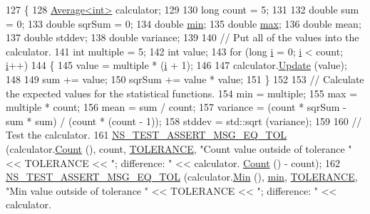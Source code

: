 \begin{DoxyCode}
127 \{
128   \hyperlink{classns3_1_1Average}{Average<int>} calculator;
129 
130   \textcolor{keywordtype}{long} count = 5;
131 
132   \textcolor{keywordtype}{double} sum = 0;
133   \textcolor{keywordtype}{double} sqrSum = 0;
134   \textcolor{keywordtype}{double} \hyperlink{80211b_8c_ac6afabdc09a49a433ee19d8a9486056d}{min};
135   \textcolor{keywordtype}{double} \hyperlink{80211b_8c_affe776513b24d84b39af8ab0930fef7f}{max};
136   \textcolor{keywordtype}{double} mean;
137   \textcolor{keywordtype}{double} stddev;
138   \textcolor{keywordtype}{double} variance;
139 
140   \textcolor{comment}{// Put all of the values into the calculator.}
141   \textcolor{keywordtype}{int} multiple = 5;
142   \textcolor{keywordtype}{int} value;
143   \textcolor{keywordflow}{for} (\textcolor{keywordtype}{long} \hyperlink{bernuolliDistribution_8m_a6f6ccfcf58b31cb6412107d9d5281426}{i} = 0; \hyperlink{bernuolliDistribution_8m_a6f6ccfcf58b31cb6412107d9d5281426}{i} < count; \hyperlink{bernuolliDistribution_8m_a6f6ccfcf58b31cb6412107d9d5281426}{i}++)
144     \{
145       value = multiple * (\hyperlink{bernuolliDistribution_8m_a6f6ccfcf58b31cb6412107d9d5281426}{i} + 1);
146 
147       calculator.\hyperlink{classns3_1_1Average_a223cb5172985f2cf4944488f4ac1186b}{Update} (value);
148 
149       sum    += value;
150       sqrSum += value * value;
151     \}
152 
153   \textcolor{comment}{// Calculate the expected values for the statistical functions.}
154   min = multiple;
155   max = multiple * count;
156   mean = sum / count;
157   variance = (count * sqrSum - sum * sum) / (count * (count - 1));
158   stddev = std::sqrt (variance);
159 
160   \textcolor{comment}{// Test the calculator.}
161   \hyperlink{group__testing_ga9e7861b56b4e70db3b56044cb7a28e41}{NS\_TEST\_ASSERT\_MSG\_EQ\_TOL} (calculator.\hyperlink{classns3_1_1Average_abdf7954e5cba2818febdd0588b8e4a20}{Count} (), count, 
      \hyperlink{average-test-suite_8cc_a89311a98397f9d6967d2cb10d5152d77}{TOLERANCE}, \textcolor{stringliteral}{"Count value outside of tolerance "} << TOLERANCE << \textcolor{stringliteral}{"; difference: "} << calculator.
      \hyperlink{classns3_1_1Average_abdf7954e5cba2818febdd0588b8e4a20}{Count} () - count);
162   \hyperlink{group__testing_ga9e7861b56b4e70db3b56044cb7a28e41}{NS\_TEST\_ASSERT\_MSG\_EQ\_TOL} (calculator.\hyperlink{classns3_1_1Average_a4649e7990b939fc55360312ac4ab6828}{Min} (), \hyperlink{80211b_8c_ac6afabdc09a49a433ee19d8a9486056d}{min}, 
      \hyperlink{average-test-suite_8cc_a89311a98397f9d6967d2cb10d5152d77}{TOLERANCE}, \textcolor{stringliteral}{"Min value outside of tolerance "} << TOLERANCE << \textcolor{stringliteral}{"; difference: "} << calculator.

\end{DoxyCode}

